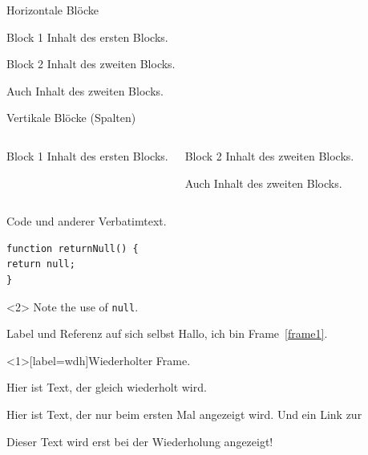 \documentclass[t, aspectratio=169, ngerman]{beamer}
\begin{document}
	\begin{frame}{Horizontale Blöcke}
		\begin{block}{Block 1}
			Inhalt des ersten Blocks.
		\end{block}
		\begin{block}{Block 2}
			Inhalt des zweiten Blocks.

			Auch Inhalt des zweiten Blocks.
		\end{block}
	\end{frame}

	\begin{frame}{Vertikale Blöcke (Spalten)}
		\begin{columns}
				\begin{block}{Block 1}
					Inhalt des ersten Blocks.
				\end{block}
				\begin{block}{Block 2}
					Inhalt des zweiten Blocks.

					Auch Inhalt des zweiten Blocks.
				\end{block}
		\end{columns}
	\end{frame}

\begin{frame}[fragile]{Code und anderer Verbatimtext.}
\begin{verbatim}
function returnNull() {
return null;
}
\end{verbatim}
\begin{uncoverenv}<2>
Note the use of \verb|null|.
\end{uncoverenv}
\end{frame}

	\begin{frame}[label=frame1]{Label und Referenz auf sich selbst}
		Hallo, ich bin Frame~\autoref{frame1}.
	\end{frame}

	\begin{frame}[label=wdh]{Wiederholter Frame.}

		Hier ist Text, der gleich wiederholt wird.

		\begin{overprint}
			Hier ist Text, der nur beim ersten Mal angezeigt wird.
			Und ein Link zur \hyperlink{wdh<2>}{}

			Dieser Text wird erst bei der Wiederholung angezeigt!
		\end{overprint}
	\end{frame}
\end{document}
